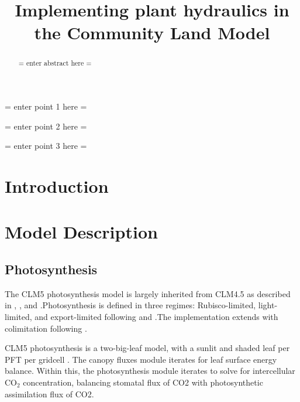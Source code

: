 \documentclass[draft,linenumbers]{agujournal}
\begin{document}
\title{Implementing plant hydraulics in the Community Land Model}



\begin{keypoints}
\item = enter point 1 here = 
\item = enter point 2 here = 
\item = enter point 3 here = 
\end{keypoints}


\begin{abstract}
= enter abstract here =
\end{abstract}


\section{Introduction}


\section{Model Description}

\subsection{Photosynthesis}
\label{sect:A}
    The CLM5 photosynthesis model is largely inherited from CLM4.5 as described in \citet{bonan2011}, \citet{thornton2007},
    and \citet{oleson2013}.Photosynthesis is defined in three regimes: Rubisco-limited, light-limited, and export-limited 
    following \citet{farquhar1980} and \citet{harley1992}.The implementation extends \citet{sellers1996a,sellers1996b} with 
    colimitation following \citet{collatz1991}. 
    
    CLM5 photosynthesis is a two-big-leaf model, with a sunlit and shaded leaf per PFT per gridcell \citep{thornton2007, 
    dai2004, oleson2013}. The canopy fluxes module iterates for leaf surface energy balance.
    Within this, the photosynthesis module iterates to solve for intercellular CO$_2$ concentration, balancing stomatal flux of 
    CO2 with photosynthetic assimilation flux of CO2.
    
\end{document}

